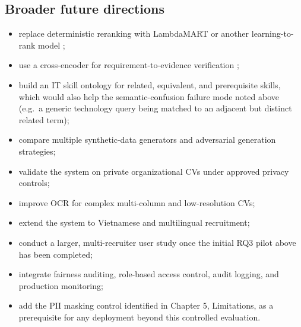 \documentclass[12pt,a4paper,oneside]{report}
\begin{document}
\subsection{Broader future directions}
\begin{itemize}
  \item replace deterministic reranking with LambdaMART or another learning-to-rank model \citep{burges2010};
  \item use a cross-encoder for requirement-to-evidence verification \citep{nogueira2019};
  \item build an IT skill ontology for related, equivalent, and prerequisite skills, which would also help the semantic-confusion failure mode noted above (e.g.\ a generic technology query being matched to an adjacent but distinct related term);
  \item compare multiple synthetic-data generators and adversarial generation strategies;
  \item validate the system on private organizational CVs under approved privacy controls;
  \item improve OCR for complex multi-column and low-resolution CVs;
  \item extend the system to Vietnamese and multilingual recruitment;
  \item conduct a larger, multi-recruiter user study once the initial RQ3 pilot above has been completed;
  \item integrate fairness auditing, role-based access control, audit logging, and production monitoring;
  \item add the PII masking control identified in Chapter 5, Limitations, as a prerequisite for any deployment beyond this controlled evaluation.
\end{itemize}
\end{document}
